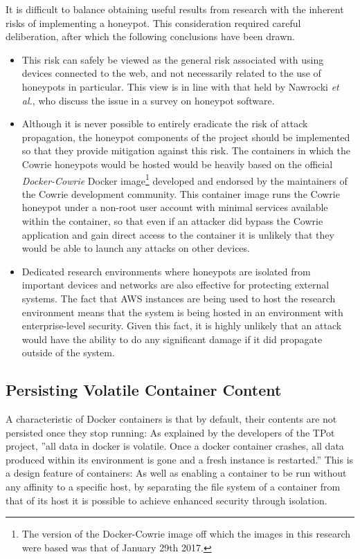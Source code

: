 It is difficult to balance obtaining useful results from research with the inherent risks of implementing a honeypot. This consideration required careful deliberation, after which the following conclusions have been drawn. 	
		
		\begin{itemize}
		\item This risk can safely be viewed as the general risk associated with using devices connected to the web, and not necessarily related to the use of honeypots in particular. This view is in line with that held by Nawrocki \textit{et al.}, who discuss the issue in a survey on honeypot software. \cite{Nawrocki2016}
		
		\item Although it is never possible to entirely eradicate the risk of attack propagation, the honeypot components of the project should be implemented so that they provide mitigation against this risk. The containers in which the Cowrie honeypots would be hosted would be heavily based on the official \textit{Docker-Cowrie} Docker image\footnote{The version of the Docker-Cowrie image off which the images in this research were based was that of January 29th 2017.} \cite{DockerCowrie} developed and endorsed by the maintainers of the Cowrie development community. This container image runs the Cowrie honeypot under a non-root user account with minimal services available within the container, so that even if an attacker did bypass the Cowrie application and gain direct access to the container it is unlikely that they would be able to launch any attacks on other devices.
            
			\item Dedicated research environments where honeypots are isolated from important devices and networks are also effective for protecting external systems. The fact that AWS instances are being used to host the research environment means that the system is being hosted in an environment with enterprise-level security. Given this fact, it is highly unlikely that an attack would have the ability to do any significant damage if it did propagate outside of the system.
		\end{itemize}		
	

    
    	\subsection{Persisting Volatile Container Content} \label{PersistingDockerContent}
        A characteristic of Docker containers is that by default, their contents are not persisted once they stop running: As explained by the developers of the TPot project,  ''all data in docker is volatile. Once a docker container crashes, all data produced within its environment is gone and a fresh instance is restarted.'' \cite{TPotWebpagev16} This is a design feature of containers: As well as enabling a container to be run without any affinity to a specific host, by separating the file system of a container from that of its host it is possible to achieve enhanced security through isolation. 

